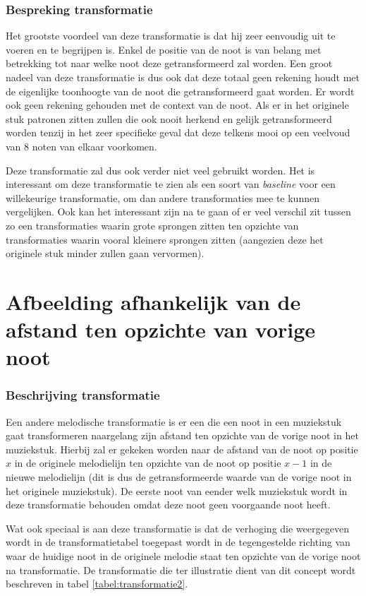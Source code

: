 \subsubsection{Bespreking transformatie}
Het grootste voordeel van deze transformatie is dat hij zeer eenvoudig uit te voeren en te begrijpen is. Enkel de positie van de noot is van belang met betrekking tot naar welke noot deze getransformeerd zal worden. Een groot nadeel van deze transformatie is dus ook dat deze totaal geen rekening houdt met de eigenlijke toonhoogte van de noot die getransformeerd gaat worden. Er wordt ook geen rekening gehouden met de context van de noot. Als er in het originele stuk patronen zitten zullen die ook nooit herkend en gelijk getransformeerd worden tenzij in het zeer specifieke geval dat deze telkens mooi op een veelvoud van 8 noten van elkaar voorkomen. 

Deze transformatie zal dus ook verder niet veel gebruikt worden. Het is interessant om deze transformatie te zien als een soort van \textit{baseline} voor een willekeurige transformatie, om dan andere transformaties mee te kunnen vergelijken. Ook kan het interessant zijn na te gaan of er veel verschil zit tussen zo een transformaties waarin grote sprongen zitten ten opzichte van transformaties waarin vooral kleinere sprongen zitten (aangezien deze het originele stuk minder zullen gaan vervormen).

\section{Afbeelding afhankelijk van de afstand ten opzichte van vorige noot}
\label{MT:afstand_vorige}
\subsubsection{Beschrijving transformatie}
Een andere melodische transformatie is er een die een noot in een muziekstuk gaat transformeren naargelang zijn afstand ten opzichte van de vorige noot in het muziekstuk. Hierbij zal er gekeken worden naar de afstand van de noot op positie $x$ in de originele melodielijn ten opzichte van de noot op positie $x-1$ in de nieuwe melodielijn (dit is dus de getransformeerde waarde van de vorige noot in het originele muziekstuk). De eerste noot van eender welk muziekstuk wordt in deze transformatie behouden omdat deze noot geen voorgaande noot heeft. 

Wat ook speciaal is aan deze transformatie is dat de verhoging die weergegeven wordt in de transformatietabel toegepast wordt in de tegengestelde richting van waar de huidige noot in de originele melodie staat ten opzichte van de vorige noot na transformatie. De transformatie die ter illustratie dient van dit concept wordt beschreven in tabel \ref{tabel:transformatie2}. 

